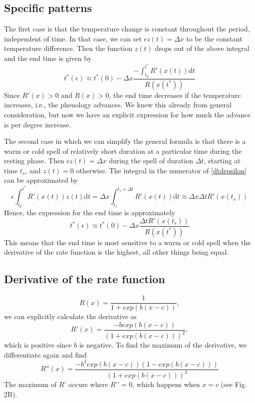 \documentclass[12 pt]{article}
\begin{document}
\subsection*{Specific patterns}
The first case is that the temperature change is constant throughout the period, independent of time. In that case, we can set $\epsilon z(t)=\Delta x$ to be the constant temperature difference. Then the function $z(t)$ drops out of the above integral and the end time is given by
\begin{equation}
    t^*(\epsilon) \approx t^*(0) - \Delta x \frac{- \int _{t_0} ^{t^*} R'(x(t)) \mathrm{d}t}{R(x(t^*))} \tag*{Eq. S\theequation}
\end{equation}
Since $R'(x)>0$ and $R(x)>0$, the end time decreases if the temperature increases, i.e., the phenology advances. We knew this already from general consideration, but now we have an explicit expression for how much the advance is per degree increase. \par

The second case in which we can simplify the general formula is that there is a warm or cold spell of relatively short duration at a particular time during the resting phase. Then $\epsilon z(t)=\Delta x$ during the spell of duration $\Delta t$, starting at time $t_s$, and $z(t)=0$ otherwise. The integral in the numerator of \ref{dtdepsilon} can be approximated by
\begin{equation}
    \epsilon \int _{t_0} ^{t^*} R'(x(t)) z(t) \mathrm{d}t = \Delta x \int _{t_s} ^{t_s + \Delta t}R'(x(t)) \mathrm{d}t \approx \Delta x \Delta t R'(x(t_s)) \tag*{Eq. S\theequation}
\end{equation}
Hence, the expression for the end time is approximately
\begin{equation}
    t^*(\epsilon) \approx t^*(0)-\Delta x \frac{\Delta t R'(x(t_s))}{R(x(t^*))} \tag*{Eq. S\theequation}
\end{equation}
This means that the end time is most sensitive to a warm or cold spell when the derivative of the rate function is the highest, all other things being equal. \par

\subsection*{Derivative of the rate function}
\begin{equation}
    R(x)=\frac{1}{1+exp(b(x-c))}, \tag*{Eq. S\theequation}
\end{equation}
we can explicitly calculate the derivative as
\begin{equation}
    R'(x)=\frac{-b exp(b(x-c))}{(1+exp(b(x-c)))^2}, \tag*{Eq. S\theequation}
\end{equation}
which is positive since $b$ is negative. To find the maximum of the derivative, we differentiate again and find
\begin{equation}
    R''(x) = \frac{-b^2 exp(b(x-c))(1-exp(b(x-c)))}{(1+exp(b(x-c)))^3} \tag*{Eq. S\theequation}
\end{equation}
The maximum of $R’$ occurs where $R’’ = 0$, which happens when $x = c$ (see Fig. 2B).
\end{document}
